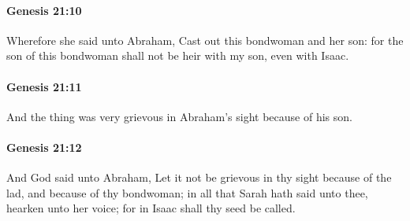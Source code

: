 		\paragraph{Genesis 21:10} %
			\label{GENESIS-21-10}

			Wherefore she said unto Abraham, Cast out this bondwoman and her son: for the son of this bondwoman shall not be heir with my son, even with Isaac.


		\paragraph{Genesis 21:11} %
			\label{GENESIS-21-11}

			And the thing was very grievous in Abraham's sight because of his son.


		\paragraph{Genesis 21:12} %
			\label{GENESIS-21-12}

			And God said unto Abraham, Let it not be grievous in thy sight because of the lad, and because of thy bondwoman; in all that Sarah hath said unto thee, hearken unto her voice; for in Isaac shall thy seed be called.


